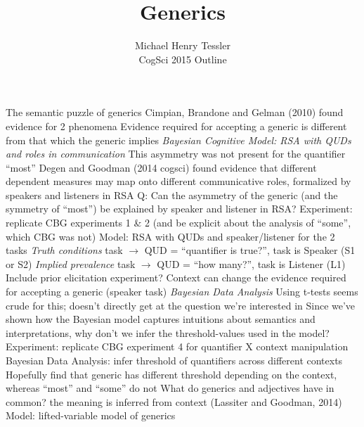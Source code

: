 \documentclass{article}
\begin{document}
\title{Generics}
\author{Michael Henry Tessler\\CogSci 2015 Outline} \maketitle
 
\begin{outline}
  \0 The semantic puzzle of generics
  	\1 Cimpian, Brandone and Gelman (2010) found evidence for 2 phenomena 
 		\2 Evidence required for accepting a generic is different from that which the generic implies
			\3 \emph{Bayesian Cognitive Model: RSA with QUDs and roles in communication}
			\3 This asymmetry was not present for the quantifier ``most''
			\3 Degen and Goodman (2014 cogsci) found evidence that different dependent measures may map onto different communicative roles, formalized by speakers and listeners in RSA
			\3 Q: Can the asymmetry of the generic (and the symmetry of ``most'') be explained by speaker and listener in RSA?
			\3 Experiment: replicate CBG experiments 1 \& 2 (and be explicit about the analysis of ``some'', which CBG was not)
			\3 Model: RSA with QUDs and speaker/listener for the 2 tasks
				\4 \emph{Truth conditions} task $\rightarrow$ QUD = ``quantifier is true?'', task is Speaker (S1 or S2)
				\4 \emph{Implied prevalence} task $\rightarrow$ QUD = ``how many?'', task is Listener (L1)
			\3 Include prior elicitation experiment?
	\2 Context can change the evidence required for accepting a generic (speaker task)
		\3 \emph{Bayesian Data Analysis}
		\3 Using t-tests seems crude for this; doesn't directly get at the question we're interested in
		\3 Since we've shown how the Bayesian model captures intuitions about semantics and interpretations, why don't we infer the threshold-values used in the model?
		\3 Experiment: replicate CBG experiment 4 for quantifier X context manipulation
		\3 Bayesian Data Analysis: infer threshold of quantifiers across different contexts
			\4 Hopefully find that generic has different threshold depending on the context, whereas ``most'' and ``some'' do not
	\1 What do generics and adjectives have in common?
		\2 the meaning is inferred from context (Lassiter and Goodman, 2014)
		\2 Model: lifted-variable model of generics
			
 \end{outline}
 
\end{document}
